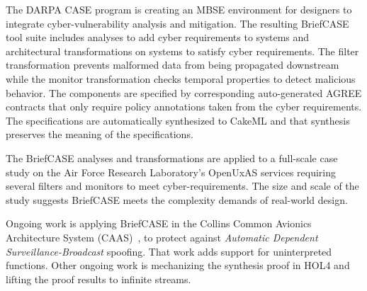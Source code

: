 The DARPA CASE program is creating an MBSE environment for designers to integrate cyber-vulnerability analysis and mitigation. The resulting BriefCASE tool suite includes analyses to add cyber requirements to systems and architectural transformations on systems to satisfy cyber requirements. The filter transformation prevents malformed data from being propagated downstream while the monitor transformation checks temporal properties to detect malicious behavior. The components are specified by corresponding auto-generated AGREE contracts that only require policy annotations taken from the cyber requirements. The specifications are automatically synthesized to CakeML and that synthesis preserves the meaning of the specifications.

The BriefCASE analyses and transformations are applied to a full-scale case study on the Air Force Research Laboratory's OpenUxAS services requiring several filters and monitors to meet cyber-requirements. 
The size and scale of the study suggests BriefCASE meets the complexity demands of real-world design.

Ongoing work is applying BriefCASE in the Collins Common Avionics Architecture System (CAAS)~\cite{caas}, to protect against \emph{Automatic Dependent Surveillance-Broadcast} spoofing. That work adds support for uninterpreted functions. Other ongoing work is mechanizing the synthesis proof in HOL4 and lifting the proof results to infinite streams.